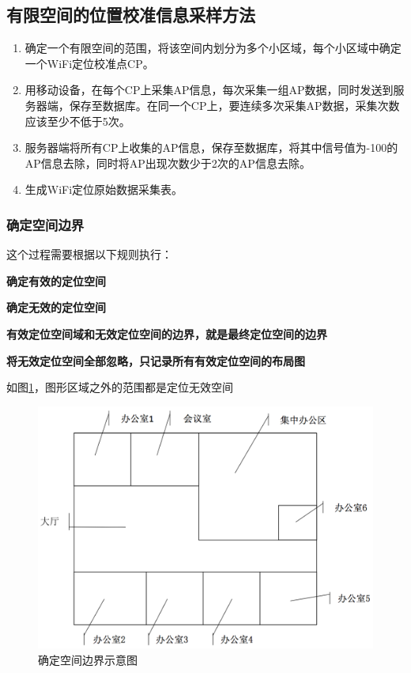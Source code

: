 \documentclass[UTF8, twocolumn ]{ctexart}
\begin{document}
\subsection{有限空间的位置校准信息采样方法}
\begin{enumerate}
\item 确定一个有限空间的范围，将该空间内划分为多个小区域，每个小区域中确定一个WiFi定位校准点CP。
\item 用移动设备，在每个CP上采集AP信息，每次采集一组AP数据，同时发送到服务器端，保存至数据库。在同一个CP上，要连续多次采集AP数据，采集次数应该至少不低于5次。
\item 服务器端将所有CP上收集的AP信息，保存至数据库，将其中信号值为-100的AP信息去除，同时将AP出现次数少于2次的AP信息去除。
\item 生成WiFi定位原始数据采集表。
\end{enumerate}

\subsubsection{确定空间边界}
这个过程需要根据以下规则执行：
\begin{compactitem}
\item\textbf{确定有效的定位空间}
\item\textbf{确定无效的定位空间}
\item\textbf{有效定位空间域和无效定位空间的边界，就是最终定位空间的边界}
\item\textbf{将无效定位空间全部忽略，只记录所有有效定位空间的布局图}
\end{compactitem}
\par
如图\ref{fig:no2}，图形区域之外的范围都是定位无效空间
\begin{figure}[!ht]\centering
  \includegraphics[keepaspectratio, scale=0.2]{no2.png}
  \caption{确定空间边界示意图\label{fig:no2}} 
\end{figure}
\end{document}
